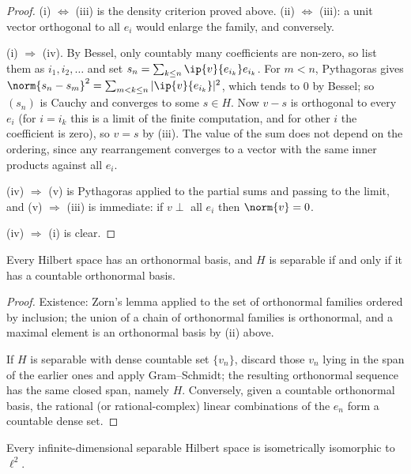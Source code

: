 \begin{proof}
	(i) $\iff$ (iii) is the density criterion proved above. (ii) $\iff$ (iii): a unit vector orthogonal to all $e_i$ would enlarge the family, and conversely.

	(i) $\Rightarrow$ (iv). By Bessel, only countably many coefficients are non-zero, so list them as $i_1, i_2, \dots$ and set $s_n = \sum_{k \leq n}\ip{v}{e_{i_k}}e_{i_k}$. For $m<n$, Pythagoras gives $\norm{s_n - s_m}^2 = \sum_{m<k\leq n}|\ip{v}{e_{i_k}}|^2$, which tends to $0$ by Bessel; so $(s_n)$ is Cauchy and converges to some $s \in H$. Now $v - s$ is orthogonal to every $e_i$ (for $i = i_k$ this is a limit of the finite computation, and for other $i$ the coefficient is zero), so $v = s$ by (iii). The value of the sum does not depend on the ordering, since any rearrangement converges to a vector with the same inner products against all $e_i$.

	(iv) $\Rightarrow$ (v) is Pythagoras applied to the partial sums and passing to the limit, and (v) $\Rightarrow$ (iii) is immediate: if $v \perp$ all $e_i$ then $\norm{v}=0$.

	(iv) $\Rightarrow$ (i) is clear.
\end{proof}

\begin{proposition}
	Every Hilbert space has an orthonormal basis, and $H$ is separable if and only if it has a countable orthonormal basis.
\end{proposition}

\begin{proof}
	Existence: Zorn's lemma applied to the set of orthonormal families ordered by inclusion; the union of a chain of orthonormal families is orthonormal, and a maximal element is an orthonormal basis by (ii) above.

	If $H$ is separable with dense countable set $\{v_n\}$, discard those $v_n$ lying in the span of the earlier ones and apply Gram--Schmidt; the resulting orthonormal sequence has the same closed span, namely $H$. Conversely, given a countable orthonormal basis, the rational (or rational-complex) linear combinations of the $e_n$ form a countable dense set.
\end{proof}

\begin{theorem}
	Every infinite-dimensional separable Hilbert space is isometrically isomorphic to $\ell^2$.
\end{theorem}

